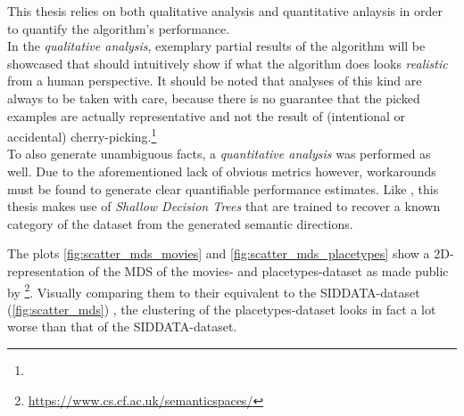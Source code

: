 This thesis relies on both qualitative analysis and quantitative anlaysis in order to quantify the algorithm's performance.\\ 
In the \textit{qualitative analysis}, exemplary partial results of the algorithm will be showcased that should intuitively show if what the algorithm does looks \textit{realistic} from a human perspective. It should be noted that analyses of this kind are always to be taken with care, because there is no guarantee that the picked examples are actually representative and not the result of (intentional or accidental) cherry-picking.\footnote{}\\
To also generate unambiguous facts, a \textit{quantitative analysis} was performed as well. Due to the aforementioned lack of obvious metrics however, workarounds must be found to generate clear quantifiable performance estimates. Like \mainalgos, this thesis makes use of \textit{Shallow Decision Trees} that are trained to recover a known category of the dataset from the generated semantic directions.


The plots \ref{fig:scatter_mds_movies} and \ref{fig:scatter_mds_placetypes} show a 2D-representation of the MDS %
of the movies- and placetypes-dataset as made public by \textcite{Derrac2015}\footnote{\url{https://www.cs.cf.ac.uk/semanticspaces/}}. Visually comparing them to their equivalent to the SIDDATA-dataset (\autoref{fig:scatter_mds}) , the clustering of the placetypes-dataset looks in fact a lot worse than that of the SIDDATA-dataset.

